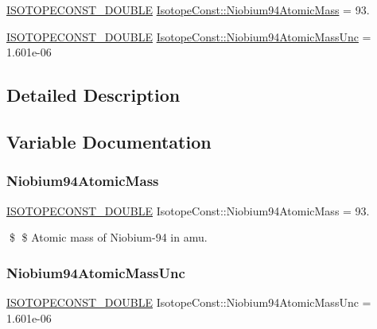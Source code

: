 \begin{DoxyCompactItemize}
\item 
\mbox{\hyperlink{group___isotope_const-_macros_ga8f45a7272ce02c0b4c65c44636ed719a}{I\+S\+O\+T\+O\+P\+E\+C\+O\+N\+S\+T\+\_\+\+D\+O\+U\+B\+LE}} \mbox{\hyperlink{group___isotope_const-_niobium-_nb94_gaf02907f3f7c2cc66a8b25981a55ee2dd}{Isotope\+Const\+::\+Niobium94\+Atomic\+Mass}} = 93.
\item 
\mbox{\hyperlink{group___isotope_const-_macros_ga8f45a7272ce02c0b4c65c44636ed719a}{I\+S\+O\+T\+O\+P\+E\+C\+O\+N\+S\+T\+\_\+\+D\+O\+U\+B\+LE}} \mbox{\hyperlink{group___isotope_const-_niobium-_nb94_gaccff8832b98f4d29a4f3ff2300b4c8da}{Isotope\+Const\+::\+Niobium94\+Atomic\+Mass\+Unc}} = 1.\+601e-\/06
\end{DoxyCompactItemize}


\subsection{Detailed Description}


\subsection{Variable Documentation}
\mbox{\label{group___isotope_const-_niobium-_nb94_gaf02907f3f7c2cc66a8b25981a55ee2dd}} 
\subsubsection{\texorpdfstring{Niobium94\+Atomic\+Mass}{Niobium94AtomicMass}}
{\footnotesize\ttfamily \mbox{\hyperlink{group___isotope_const-_macros_ga8f45a7272ce02c0b4c65c44636ed719a}{I\+S\+O\+T\+O\+P\+E\+C\+O\+N\+S\+T\+\_\+\+D\+O\+U\+B\+LE}} Isotope\+Const\+::\+Niobium94\+Atomic\+Mass = 93.}

\$ \$ Atomic mass of Niobium-\/94 in amu. \mbox{\label{group___isotope_const-_niobium-_nb94_gaccff8832b98f4d29a4f3ff2300b4c8da}} 
\subsubsection{\texorpdfstring{Niobium94\+Atomic\+Mass\+Unc}{Niobium94AtomicMassUnc}}
{\footnotesize\ttfamily \mbox{\hyperlink{group___isotope_const-_macros_ga8f45a7272ce02c0b4c65c44636ed719a}{I\+S\+O\+T\+O\+P\+E\+C\+O\+N\+S\+T\+\_\+\+D\+O\+U\+B\+LE}} Isotope\+Const\+::\+Niobium94\+Atomic\+Mass\+Unc = 1.\+601e-\/06}

